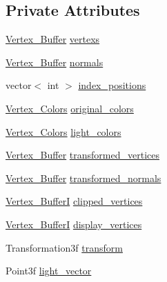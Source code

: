 \subsection*{Private Attributes}
\begin{DoxyCompactItemize}
\item 
\mbox{\hyperlink{classrenderer_1_1_mesh_a8c848a95f65fb25f6dc94dcb8879cf8b}{Vertex\+\_\+\+Buffer}} \mbox{\hyperlink{classrenderer_1_1_mesh_a09d0844ff04aec6c504b44c261cf81e1}{vertexs}}
\item 
\mbox{\hyperlink{classrenderer_1_1_mesh_a8c848a95f65fb25f6dc94dcb8879cf8b}{Vertex\+\_\+\+Buffer}} \mbox{\hyperlink{classrenderer_1_1_mesh_a88ff332e89b6278946fc7f61f0014d0d}{normals}}
\item 
vector$<$ int $>$ \mbox{\hyperlink{classrenderer_1_1_mesh_a67f50b2b651091b38567c8fd69e9e4b3}{index\+\_\+positions}}
\item 
\mbox{\hyperlink{classrenderer_1_1_mesh_ab384ccca7ccccac4b935fe797ce0a7ea}{Vertex\+\_\+\+Colors}} \mbox{\hyperlink{classrenderer_1_1_mesh_aa32dd73ecaaaf1f5594f12c6208df116}{original\+\_\+colors}}
\item 
\mbox{\hyperlink{classrenderer_1_1_mesh_ab384ccca7ccccac4b935fe797ce0a7ea}{Vertex\+\_\+\+Colors}} \mbox{\hyperlink{classrenderer_1_1_mesh_a548a365c33a70a93e8a1f7c4085b1ec8}{light\+\_\+colors}}
\item 
\mbox{\hyperlink{classrenderer_1_1_mesh_a8c848a95f65fb25f6dc94dcb8879cf8b}{Vertex\+\_\+\+Buffer}} \mbox{\hyperlink{classrenderer_1_1_mesh_a670137619aeda905f64bc784265ccbe5}{transformed\+\_\+vertices}}
\item 
\mbox{\hyperlink{classrenderer_1_1_mesh_a8c848a95f65fb25f6dc94dcb8879cf8b}{Vertex\+\_\+\+Buffer}} \mbox{\hyperlink{classrenderer_1_1_mesh_a17a0e6c0c5d85b761ae43ec601a346ea}{transformed\+\_\+normals}}
\item 
\mbox{\hyperlink{classrenderer_1_1_mesh_ac5074bb370a7062d07e11150de94e8be}{Vertex\+\_\+\+BufferI}} \mbox{\hyperlink{classrenderer_1_1_mesh_a895006513e43820bed66a13e6860c072}{clipped\+\_\+vertices}}
\item 
\mbox{\hyperlink{classrenderer_1_1_mesh_ac5074bb370a7062d07e11150de94e8be}{Vertex\+\_\+\+BufferI}} \mbox{\hyperlink{classrenderer_1_1_mesh_ab375734fbd3ad209425e38f89f64ab5d}{display\+\_\+vertices}}
\item 
Transformation3f \mbox{\hyperlink{classrenderer_1_1_mesh_a6d4a64b911980ccd50a4fc54830ce653}{transform}}
\item 
Point3f \mbox{\hyperlink{classrenderer_1_1_mesh_a6bf2d3288700befda4d24c6ee44e7a3f}{light\+\_\+vector}}
\end{DoxyCompactItemize}


